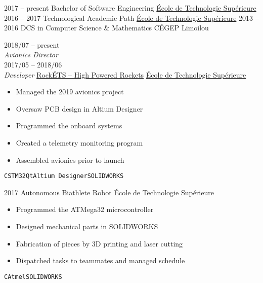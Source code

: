 \documentclass[9pt]{developercv} %
\begin{document}
\begin{minipage}[t]{0.8\textwidth}

\begin{entrylist}
	\entry
		{2017 -- present}
		{Bachelor of Software Engineering}
		{\href{https://etsmtl.ca}{École de Technologie Supérieure}}
		{\vspace{-14pt}}
	\entry
		{2016 -- 2017}
		{Technological Academic Path}
		{\href{https://etsmtl.ca}{École de Technologie Supérieure}}
		{\vspace{-14pt}}
	\entry
		{2013 -- 2016}
		{DCS in Computer Science \& Mathematics}
		{CÉGEP Limoilou}
		{\vspace{-14pt}}
\end{entrylist}



\begin{entrylist}
	\entry
		{2018/07 -- present\\{\small\emph{Avionics Director}}\\2017/05 -- 2018/06\\{\small\emph{Developer}}}
		{\href{https://clubrockets.ca/en/}{RockÉTS -- High Powered Rockets}}
		{\href{https://clubrockets.ca/en/}{École de Technologie Supérieure}}
		{
			\vspace{-14pt}
			\begin{itemize}
				\renewcommand{\labelitemi}{\raisebox{.45ex}{\rule{.6ex}{.6ex}}} 
				\setlength\itemsep{-1pt}
				\item Managed the 2019 avionics project
				\item Oversaw PCB design in Altium Designer
				\item Programmed the onboard systems
				\item Created a telemetry monitoring program
				\item Assembled  avionics prior to launch
			\end{itemize}
			\vspace{-4pt}
			\texttt{C}\slashsep\texttt{STM32}\slashsep\texttt{Qt}\slashsep\texttt{Altium Designer}\slashsep\texttt{SOLIDWORKS}
		}
	\entry
		{2017}
		{Autonomous Biathlete Robot}
		{École de Technologie Supérieure}
		{
			\vspace{-14pt}
			\begin{itemize}
				\renewcommand{\labelitemi}{\raisebox{.45ex}{\rule{.6ex}{.6ex}}} 
				\setlength\itemsep{-1pt}
				\item Programmed the ATMega32 microcontroller
				\item Designed mechanical parts in SOLIDWORKS
				\item Fabrication of pieces by 3D printing and laser cutting
				\item Dispatched tasks to teammates and managed schedule
			\end{itemize}
			\vspace{-4pt}
			\texttt{C}\slashsep\texttt{Atmel}\slashsep\texttt{SOLIDWORKS}
		}
\end{entrylist}


\end{minipage}
\end{document}
